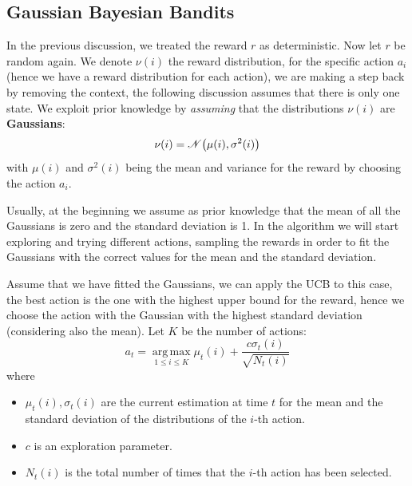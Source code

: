 \documentclass[10pt, a4paper]{report}
\begin{document}
\subsection{Gaussian Bayesian Bandits}
In the previous discussion, we treated the reward $r$ as deterministic. Now let $r$ be random again. We denote $\nu(i)$ the reward distribution, for the specific action $a_i$ (hence we have a reward distribution for each action), we are making a step back by removing the context, the following discussion assumes that there is only one state.
We exploit  prior knowledge by \textit{assuming} that the distributions $\nu(i)$ are \textbf{Gaussians}:\begin{equation}
    \nu(i)=\mathscr{N}\big(\mu(i),\sigma^2(i)\big)
\end{equation}
with $\mu(i)$ and $\sigma^2(i)$ being the mean and variance for the reward by choosing the action $a_i$.
\begin{center}
\end{center}
Usually, at the beginning we assume as prior knowledge that the mean of all the Gaussians is zero and the standard deviation is 1. In the algorithm we will start exploring and trying different actions, sampling the rewards in order to fit the Gaussians with the correct values for the mean and the standard deviation.\bigskip 

Assume that we have fitted the Gaussians, we can apply the UCB to this case, the best action is the one with the highest upper bound for the reward, hence we choose the action with the Gaussian with the highest  standard deviation (considering also the mean). Let $K$ be the number of actions:\begin{equation}
    a_t=\operatorname*{arg\,max}_{1\le i \le K}\mu_t(i)+\frac{c\sigma_t(i)}{\sqrt{N_t(i)}}
\end{equation}
where\begin{itemize}
    \item $\mu_t(i),\sigma_t(i)$ are the current estimation at time $t$ for the mean and the standard deviation of the distributions of the $i$-th action.
    \item $c$ is an exploration parameter.
    \item $N_t(i)$ is the total number of times that the $i$-th action has been selected.
\end{itemize}
\end{document}
